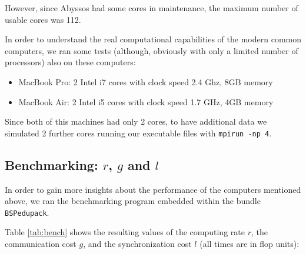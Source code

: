 \documentclass[a4paper,11pt]{article}
\begin{document}
However, since Abyssos had some cores in maintenance, the maximum number of usable cores was 112.

In order to understand the real computational capabilities of the modern common computers, we ran some tests (although, obviously with only a limited number of processors) also on these computers:

\begin{itemize}
\item MacBook Pro: 2 Intel i7 cores with clock speed 2.4 Ghz, 8GB memory
\item MacBook Air: 2 Intel i5 cores with clock speed 1.7 GHz, 4GB memory
\end{itemize}

Since both of this machines had only 2 cores, to have additional data we simulated 2 further cores running our executable files with \texttt{mpirun -np 4}.

\subsection{Benchmarking: $r$, $g$ and $l$}

In order to gain more insights about the performance of the computers mentioned above, we ran the benchmarking program embedded within the bundle \verb|BSPedupack|\citep{bspedupack}.

Table \ref{tab:bench} shows the resulting values of the computing rate $r$, the communication cost $g$, and the synchronization cost $l$ (all times are in flop units):
\end{document}
